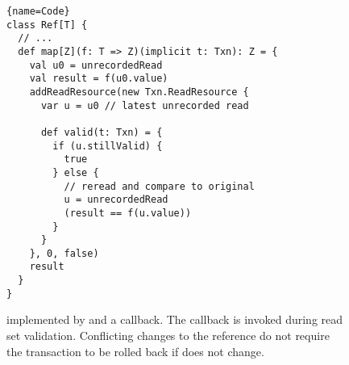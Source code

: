\begin{figure}
\begin{lstlisting}{name=Code}
class Ref[T] {
  // ...
  def map[Z](f: T => Z)(implicit t: Txn): Z = {
    val u0 = unrecordedRead
    val result = f(u0.value)
    addReadResource(new Txn.ReadResource {
      var u = u0 // latest unrecorded read
  
      def valid(t: Txn) = {
        if (u.stillValid) {
          true
        } else {
          // reread and compare to original
          u = unrecordedRead
          (result == f(u.value))
        }
      }
    }, 0, false)
    result
  }
}
\end{lstlisting}

\caption{ implemented by 
and a  callback.  The callback is invoked during read
set validation.  Conflicting changes to the reference do not require
the transaction to be rolled back if  does not change.}

\label{fig:map}
\end{figure}

